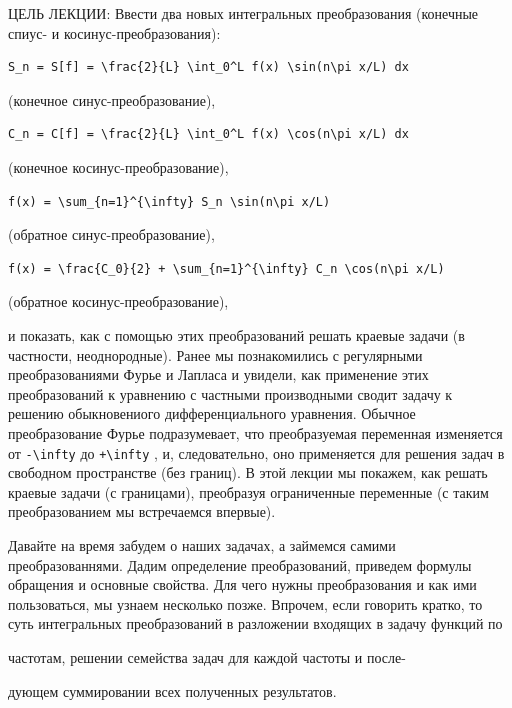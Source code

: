 \documentclass[
  ukrainian,
]{article}
\begin{document}
ЦЕЛЬ ЛЕКЦИИ: Ввести два новых интегральных преобразования (конечные
спиус- и косинус-преобразования):

\begin{verbatim}
S_n = S[f] = \frac{2}{L} \int_0^L f(x) \sin(n\pi x/L) dx
\end{verbatim}

(конечное синус-преобразование),

\begin{verbatim}
C_n = C[f] = \frac{2}{L} \int_0^L f(x) \cos(n\pi x/L) dx
\end{verbatim}

(конечное косинус-преобразование),

\begin{verbatim}
f(x) = \sum_{n=1}^{\infty} S_n \sin(n\pi x/L)
\end{verbatim}

(обратное синус-преобразование),

\begin{verbatim}
f(x) = \frac{C_0}{2} + \sum_{n=1}^{\infty} C_n \cos(n\pi x/L)
\end{verbatim}

(обратное косинус-преобразование),

и показать, как с помощью этих преобразований решать краевые задачи (в
частности, неоднородные). Ранее мы познакомились с регулярными
преобразованиями Фурье и Лапласа и увидели, как применение этих
преобразований к уравнению с частными производными сводит задачу к
решению обыкновениого дифференциального уравнения. Обычное
преобразование Фурье подразумевает, что преобразуемая переменная
изменяется от \texttt{-\textbackslash{}infty} до
\texttt{+\textbackslash{}infty} , и, следовательно, оно применяется для
решения задач в свободном пространстве (без границ). В этой лекции мы
покажем, как решать краевые задачи (с границами), преобразуя
ограниченные переменные (с таким преобразованием мы встречаемся
впервые).

Давайте на время забудем о наших задачах, а займемся самими
преобразованнями. Дадим определение преобразований, приведем формулы
обращения и основные свойства. Для чего нужны преобразования и как ими
пользоваться, мы узнаем несколько позже. Впрочем, если говорить кратко,
то суть интегральных преобразований в разложении входящих в задачу
функций по

частотам, решении семейства задач для каждой частоты и после-

дующем суммировании всех полученных результатов.
\end{document}
